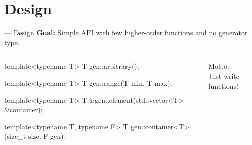 
\section{Design}

\begin{frame}[t,fragile]{\halcheck{} --- Design}
  \textbf{Goal:} Simple API with few higher-order functions and no generator type.\\

  \begin{columns}[onlytextwidth]
    \begin{cppcode}
      template<typename T>
      T gen::arbitrary();

      template<typename T>
      T gen::range(T min, T max);

      template<typename T>
      T &gen::element(std::vector<T> &container);

      template<typename T, typename F>
      T gen::container<T>(size_t size, F gen);
    \end{cppcode}

    \centering\Large Motto:\\\alert{Just write functions!}
  \end{columns}
\end{frame}

